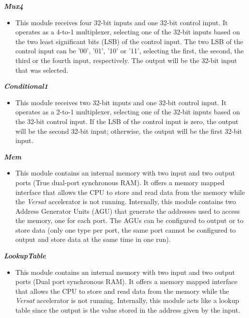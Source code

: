 \vspace{0.5cm}

\textbf{\textit{Mux4}}
\begin{itemize}
\item  This module receives four 32-bit inputs and one 32-bit control input. It operates as a 4-to-1 multiplexer, selecting one of the 32-bit inputs based on the two least significant bits (LSB) of the control input. 
The two LSB of the control input can be '00', '01', '10' or '11', selecting the first, the second, the third or the fourth input, respectively. The output will be the 32-bit input that was selected.
\end{itemize}

\vspace{0.5cm}

\textbf{\textit{Conditional1}}
\begin{itemize}
\item  This module receives two 32-bit inputs and one 32-bit control input. It operates as a 2-to-1 multiplexer, selecting one of the 32-bit inputs based on the 32-bit control input. 
If the LSB of the control input is zero, the output will be the second 32-bit input; otherwise, the output will be the first 32-bit input.
\end{itemize}

\vspace{0.5cm}

\textbf{\textit{Mem}}
\begin{itemize}
\item  This module contains an internal memory with two input and two output ports (True dual-port synchronous RAM). It offers a memory mapped interface that allows the CPU to store and read data from the memory while the \textit{Versat} accelerator is not running. 
Internally, this module contains two Address Generator Units (AGU) that generate the addresses used to access the memory, one for each port. The AGUs can be configured to output or to store data (only one type per port, the same port cannot be configured to output and store data at the same time in one run).
\end{itemize}

\vspace{0.5cm}

\textbf{\textit{LookupTable}}
\begin{itemize}
\item This module contains an internal memory with two input and two output ports (Dual port synchronous RAM). It offers a memory mapped interface that allows the CPU to store and read data from the memory while the \textit{Versat} accelerator is not running. 
Internally, this module acts like a lookup table since the output is the value stored in the address given by the input.
\end{itemize}

